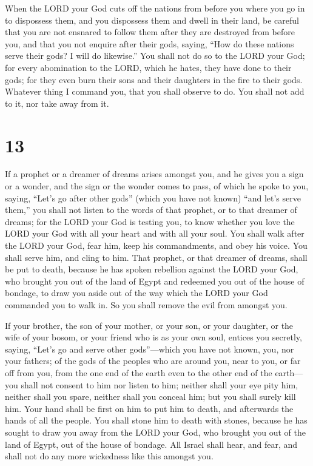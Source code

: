  When the LORD your God cuts off the nations from before
you where you go in to dispossess them, and you dispossess them and
dwell in their land,  be careful that you are not ensnared
to follow them after they are destroyed from before you, and that you
not enquire after their gods, saying, ``How do these nations serve their
gods? I will do likewise.''  You shall not do so to the
LORD your God; for every abomination to the LORD, which he hates, they
have done to their gods; for they even burn their sons and their
daughters in the fire to their gods.  Whatever thing I
command you, that you shall observe to do. You shall not add to it, nor
take away from it.

\hypertarget{section-12}{%
\section{13}\label{section-12}}

 If a prophet or a dreamer of dreams arises amongst you, and
he gives you a sign or a wonder,  and the sign or the wonder
comes to pass, of which he spoke to you, saying, ``Let's go after other
gods'' (which you have not known) ``and let's serve them,'' 
you shall not listen to the words of that prophet, or to that dreamer of
dreams; for the LORD your God is testing you, to know whether you love
the LORD your God with all your heart and with all your soul.
 You shall walk after the LORD your God, fear him, keep his
commandments, and obey his voice. You shall serve him, and cling to him.
 That prophet, or that dreamer of dreams, shall be put to
death, because he has spoken rebellion against the LORD your God, who
brought you out of the land of Egypt and redeemed you out of the house
of bondage, to draw you aside out of the way which the LORD your God
commanded you to walk in. So you shall remove the evil from amongst you.

 If your brother, the son of your mother, or your son, or
your daughter, or the wife of your bosom, or your friend who is as your
own soul, entices you secretly, saying, ``Let's go and serve other
gods''---which you have not known, you, nor your fathers; 
of the gods of the peoples who are around you, near to you, or far off
from you, from the one end of the earth even to the other end of the
earth---  you shall not consent to him nor listen to him;
neither shall your eye pity him, neither shall you spare, neither shall
you conceal him;  but you shall surely kill him. Your hand
shall be first on him to put him to death, and afterwards the hands of
all the people.  You shall stone him to death with stones,
because he has sought to draw you away from the LORD your God, who
brought you out of the land of Egypt, out of the house of bondage.
 All Israel shall hear, and fear, and shall not do any more
wickedness like this amongst you.

